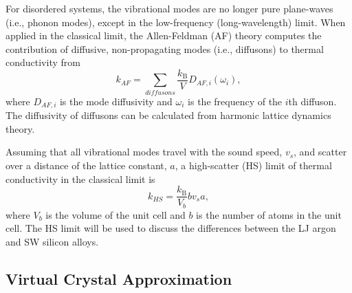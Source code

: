 For disordered systems, the vibrational modes are no 
longer pure plane-waves (i.e., phonon modes), except in the low-frequency 
(long-wavelength) limit. When applied in the classical limit, 
the Allen-Feldman (AF) theory computes 
the contribution of diffusive, non-propagating modes (i.e., diffusons) 
to thermal conductivity from\cite{allen_thermal_1993} 
\begin{equation}\label{EQ:M:k_AF}
k_{AF} = \sum_{diffusons} \frac{k_{\text{B}}}{V} D_{AF,i}(\omega_i),
\end{equation}
where $D_{AF,i}$ is the mode diffusivity and $\omega_i$ is the 
frequency of the $i$th diffuson. The diffusivity of diffusons 
can be calculated from harmonic lattice dynamics theory.
\cite{allen_thermal_1993,feldman_thermal_1993,feldman_numerical_1999} 

Assuming that all vibrational modes travel with the sound speed, $v_s$, and 
scatter over a distance of the lattice constant, $a$, 
a high-scatter (HS) limit of thermal conductivity in the classical 
limit is\cite{cahill_lattice_1988} 
\begin{equation}\label{EQ:M:k_AF,HS}
k_{HS} = \frac{k_{\text{B}}}{V_b}b v_s a,
\end{equation}
where $V_b$ is the volume of the unit cell and $b$ is the number of atoms 
in the unit cell. The HS limit will be used to 
discuss the differences between the LJ argon and SW silicon alloys. 



\subsection{\label{S:Virtual Crystal}Virtual Crystal Approximation}

